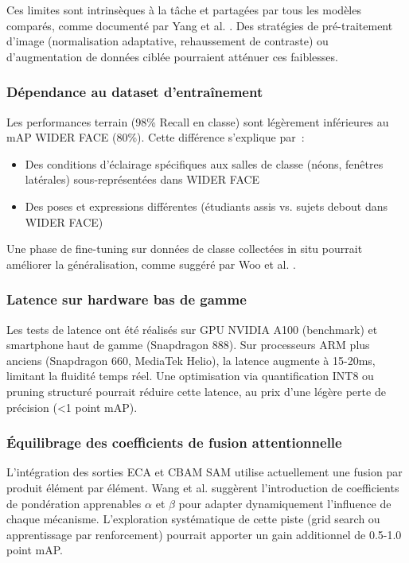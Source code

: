 \begin{onehalfspace}
\hspace{0.65 cm}Ces limites sont intrinsèques à la tâche et partagées par tous les modèles comparés, comme documenté par Yang et al. \cite{Yang2016WIDERFACE}. Des stratégies de pré-traitement d'image (normalisation adaptative, rehaussement de contraste) ou d'augmentation de données ciblée pourraient atténuer ces faiblesses.

\subsubsection{Dépendance au dataset d'entraînement}

\hspace{0.65 cm}Les performances terrain (98\% Recall en classe) sont légèrement inférieures au mAP WIDER FACE (80\%). Cette différence s'explique par~:
\begin{itemize}
\item Des conditions d'éclairage spécifiques aux salles de classe (néons, fenêtres latérales) sous-représentées dans WIDER FACE
\item Des poses et expressions différentes (étudiants assis vs. sujets debout dans WIDER FACE)
\end{itemize}

\hspace{0.65 cm}Une phase de fine-tuning sur données de classe collectées in situ pourrait améliorer la généralisation, comme suggéré par Woo et al. \cite{Woo2018CBAM}.

\subsubsection{Latence sur hardware bas de gamme}

\hspace{0.65 cm}Les tests de latence ont été réalisés sur GPU NVIDIA A100 (benchmark) et smartphone haut de gamme (Snapdragon 888). Sur processeurs ARM plus anciens (Snapdragon 660, MediaTek Helio), la latence augmente à 15-20ms, limitant la fluidité temps réel. Une optimisation via quantification INT8 ou pruning structuré pourrait réduire cette latence, au prix d'une légère perte de précision (<1 point mAP).

\subsubsection{Équilibrage des coefficients de fusion attentionnelle}

\hspace{0.65 cm}L'intégration des sorties ECA et CBAM SAM utilise actuellement une fusion par produit élément par élément. Wang et al. \cite{Wang2024ECACBAM} suggèrent l'introduction de coefficients de pondération apprenables $\alpha$ et $\beta$ pour adapter dynamiquement l'influence de chaque mécanisme. L'exploration systématique de cette piste (grid search ou apprentissage par renforcement) pourrait apporter un gain additionnel de 0.5-1.0 point mAP.


\end{onehalfspace}
